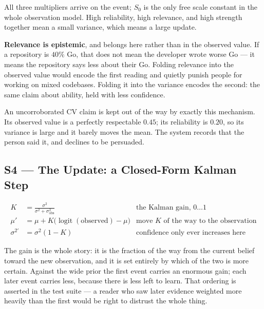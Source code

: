 \documentclass[11pt,a4paper]{article}
\DeclareMathOperator{\logit}{logit}
\newenvironment{keyeq}{%
  \begin{shaded}
  \centering
}{%
  \end{shaded}
}
\begin{document}
All three multipliers arrive on the event; $S_0$ is the only free scale
constant in the whole observation model. High reliability, high relevance,
and high strength together mean a small variance, which means a large
update.

\textbf{Relevance is epistemic}, and belongs here rather than in the
observed value. If a repository is $40\%$ Go, that does not mean the
developer wrote worse Go --- it means the repository says less about their
Go. Folding relevance into the observed value would encode the first
reading and quietly punish people for working on mixed codebases. Folding
it into the variance encodes the second: the same claim about ability, held
with less confidence.

An uncorroborated CV claim is kept out of the way by exactly this
mechanism. Its observed value is a perfectly respectable $0.45$; its
reliability is $0.20$, so its variance is large and it barely moves the
mean. The system records that the person said it, and declines to be
persuaded.

\subsection{S4 --- The Update: a Closed-Form Kalman Step}

\begin{keyeq}
\begin{align*}
K   &= \frac{\sigma^2}{\sigma^2+\sigma^2_{\text{obs}}}
       & \text{the Kalman gain, } 0\ldots 1\\[3pt]
\mu' &= \mu + K\big(\logit(\text{observed}) - \mu\big)
       & \text{move } K \text{ of the way to the observation}\\[3pt]
\sigma^{2\prime} &= \sigma^2(1-K)
       & \text{confidence only ever increases here}
\end{align*}
\end{keyeq}

The gain is the whole story: it is the fraction of the way from the current
belief toward the new observation, and it is set entirely by which of the
two is more certain. Against the wide prior the first event carries an
enormous gain; each later event carries less, because there is less left to
learn. That ordering is asserted in the test suite --- a reader who saw
later evidence weighted more heavily than the first would be right to
distrust the whole thing.
\end{document}
